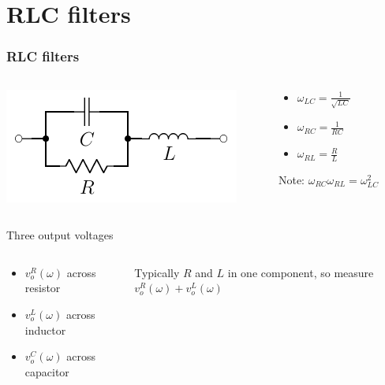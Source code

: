 \documentclass[beamer]{standalone}
\begin{document}
\section{RLC filters}
\begin{frame}
 \frametitle{RLC filters}
 \begin{columns}
  \begin{column}{0.4\textwidth}
   \includegraphics[width=\textwidth]{pics/RLC_circuit}
  \end{column}
  \begin{column}{0.6\textwidth}
   \begin{itemize}
    \item $\omega_{LC} = \frac{1}{\sqrt{LC}}$
    \item $\omega_{RC} = \frac{1}{RC}$
    \item $\omega_{RL} = \frac{R}{L}$
   \end{itemize}
   Note: $\omega_{RC} \omega_{RL} = \omega^2_{LC}$
  \end{column}
 \end{columns}
 \begin{block}{Three output voltages}
  \begin{columns}
   \begin{column}{0.5\textwidth}
    \begin{itemize}
     \item $v_o^R(\omega)$ across resistor
     \item $v_o^L(\omega)$ across inductor
     \item $v_o^C(\omega)$ across capacitor
    \end{itemize}
   \end{column}
   \begin{column}{0.5\textwidth}
    Typically $R$ and $L$ in one component, so measure $v_o^R(\omega) + v_o^L(\omega)$
   \end{column}
  \end{columns}
 \end{block}
\end{frame}
\end{document}
